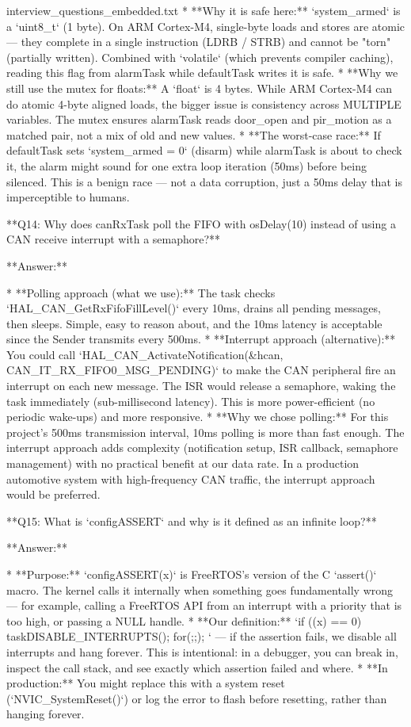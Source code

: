 \begin{filecontents*}{interview_questions_embedded.txt}
* **Why it is safe here:** `system_armed` is a `uint8_t` (1 byte). On ARM Cortex-M4, single-byte loads and stores are atomic — they complete in a single instruction (LDRB / STRB) and cannot be "torn" (partially written). Combined with `volatile` (which prevents compiler caching), reading this flag from alarmTask while defaultTask writes it is safe.
* **Why we still use the mutex for floats:** A `float` is 4 bytes. While ARM Cortex-M4 can do atomic 4-byte aligned loads, the bigger issue is consistency across MULTIPLE variables. The mutex ensures alarmTask reads door_open and pir_motion as a matched pair, not a mix of old and new values.
* **The worst-case race:** If defaultTask sets `system_armed = 0` (disarm) while alarmTask is about to check it, the alarm might sound for one extra loop iteration (50ms) before being silenced. This is a benign race — not a data corruption, just a 50ms delay that is imperceptible to humans.

**Q14: Why does canRxTask poll the FIFO with osDelay(10) instead of using a CAN receive interrupt with a semaphore?**

**Answer:**

* **Polling approach (what we use):** The task checks `HAL_CAN_GetRxFifoFillLevel()` every 10ms, drains all pending messages, then sleeps. Simple, easy to reason about, and the 10ms latency is acceptable since the Sender transmits every 500ms.
* **Interrupt approach (alternative):** You could call `HAL_CAN_ActivateNotification(&hcan, CAN_IT_RX_FIFO0_MSG_PENDING)` to make the CAN peripheral fire an interrupt on each new message. The ISR would release a semaphore, waking the task immediately (sub-millisecond latency). This is more power-efficient (no periodic wake-ups) and more responsive.
* **Why we chose polling:** For this project's 500ms transmission interval, 10ms polling is more than fast enough. The interrupt approach adds complexity (notification setup, ISR callback, semaphore management) with no practical benefit at our data rate. In a production automotive system with high-frequency CAN traffic, the interrupt approach would be preferred.

**Q15: What is `configASSERT` and why is it defined as an infinite loop?**

**Answer:**

* **Purpose:** `configASSERT(x)` is FreeRTOS's version of the C `assert()` macro. The kernel calls it internally when something goes fundamentally wrong — for example, calling a FreeRTOS API from an interrupt with a priority that is too high, or passing a NULL handle.
* **Our definition:** `if ((x) == 0) { taskDISABLE_INTERRUPTS(); for(;;); }` — if the assertion fails, we disable all interrupts and hang forever. This is intentional: in a debugger, you can break in, inspect the call stack, and see exactly which assertion failed and where.
* **In production:** You might replace this with a system reset (`NVIC_SystemReset()`) or log the error to flash before resetting, rather than hanging forever.


\end{filecontents*}
